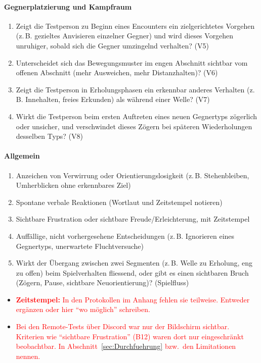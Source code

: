 \documentclass[../Main.tex]{subfiles}
\begin{document}
\paragraph{Gegnerplatzierung und Kampfraum}
\begin{enumerate}[label=\textbf{B\arabic*}, leftmargin=1.5cm, itemsep=0.5em, resume]
    \item Zeigt die Testperson zu Beginn eines Encounters ein zielgerichtetes Vorgehen (z.\,B. gezieltes Anvisieren einzelner Gegner) und wird dieses Vorgehen unruhiger, sobald sich die Gegner umzingelnd verhalten? \hfill (V5)
    \item Unterscheidet sich das Bewegungsmuster im engen Abschnitt sichtbar vom offenen Abschnitt (mehr Ausweichen, mehr Distanzhalten)? \hfill (V6)
    \item Zeigt die Testperson in Erholungsphasen ein erkennbar anderes Verhalten (z.\,B. Innehalten, freies Erkunden) als während einer Welle? \hfill (V7)
    \item Wirkt die Testperson beim ersten Auftreten eines neuen Gegnertyps zögerlich oder unsicher, und verschwindet dieses Zögern bei späteren Wiederholungen desselben Typs? \hfill (V8)
\end{enumerate}

\paragraph{Allgemein}
\begin{enumerate}[label=\textbf{B\arabic*}, leftmargin=1.5cm, itemsep=0.5em, resume]
    \item Anzeichen von Verwirrung oder Orientierungslosigkeit (z.\,B. Stehenbleiben, Umherblicken ohne erkennbares Ziel)
    \item Spontane verbale Reaktionen (Wortlaut und Zeitstempel notieren)
    \item Sichtbare Frustration oder sichtbare Freude/Erleichterung, mit Zeitstempel
    \item Auffällige, nicht vorhergesehene Entscheidungen (z.\,B. Ignorieren eines Gegnertyps, unerwartete Fluchtversuche)
    \item Wirkt der Übergang zwischen zwei Segmenten (z.\,B. Welle zu Erholung, eng zu offen) beim Spielverhalten fliessend, oder gibt es einen sichtbaren Bruch (Zögern, Pause, sichtbare Neuorientierung)? \hfill (Spielfluss)
\end{enumerate}

\begin{itemize}[leftmargin=1.5cm]
    \item \textcolor{red}{\textbf{Zeitstempel:} In den Protokollen im Anhang fehlen sie teilweise. Entweder ergänzen oder hier \enquote{wo möglich} schreiben.}
    \item \textcolor{red}{Bei den Remote-Tests über Discord war nur der Bildschirm sichtbar. Kriterien wie \enquote{sichtbare Frustration} (B12) waren dort nur eingeschränkt beobachtbar. In Abschnitt~\ref{sec:Durchfuehrung} bzw.\ den Limitationen nennen.}
\end{itemize}
\end{document}
